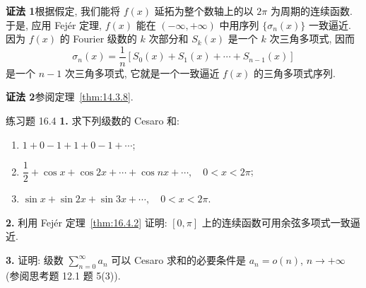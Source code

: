 \textbf{证法 1}\quad 根据假定, 我们能将 $f(x)$ 延拓为整个数轴上的以 $2\pi$ 为周期的连续函数. 于是, 应用 Fej\'er 定理, $f(x)$ 能在 $(-\infty,+\infty)$ 中用序列 $\{\sigma_{n}(x)\}$ 一致逼近. 因为 $f(x)$ 的 Fourier 级数的 $k$ 次部分和 $S_{k}(x)$ 是一个 $k$ 次三角多项式, 因而
\[
  \sigma_{n}(x)=\frac{1}{n}\left[S_{0}(x)+S_{1}(x)+\cdots+S_{n-1}(x)\right]
\]
是一个 $n-1$ 次三角多项式, 它就是一个一致逼近 $f(x)$ 的三角多项式序列.

\textbf{证法 2}\quad 参阅定理~\ref{thm:14.3.8}.

\begin{exblock}{练习题 16.4}
\textbf{1.} 求下列级数的 Cesaro 和:
\begin{enumerate}
\item $1+0-1+1+0-1+\cdots$;
\item $\dfrac{1}{2}+\cos x+\cos 2x+\cdots+\cos nx+\cdots,\quad 0<x<2\pi$;
\item $\sin x+\sin 2x+\sin 3x+\cdots,\quad 0<x<2\pi.$
\end{enumerate}

\textbf{2.} 利用 Fej\'er 定理~\ref{thm:16.4.2} 证明: $[0,\pi]$ 上的连续函数可用余弦多项式一致逼近.

\textbf{3.} 证明: 级数 $\displaystyle\sum_{n=0}^{\infty}a_{n}$ 可以 Cesaro 求和的必要条件是 $a_{n}=o(n)$, $n\to+\infty$ (参阅思考题 12.1 题 5(3)).
\end{exblock}

